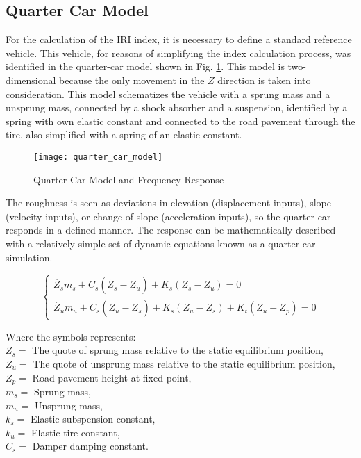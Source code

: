 \documentclass[tesi]{subfiles}
\begin{document}
\subsection{Quarter Car Model}\label{ssc:Quarter Car Model}
For the calculation of the IRI index, it is necessary to define a standard reference vehicle\cite{little_book}. This vehicle, for reasons of simplifying the index calculation process, was identified in the quarter-car model shown in Fig. \ref{fig:Quarter Car Model}. This model is two-dimensional because the only
movement in the $Z$ direction is taken into consideration. This model schematizes the vehicle with a sprung mass and a unsprung mass, connected by a shock absorber and a suspension, identified by a spring with own elastic constant and connected to the road pavement through the tire, also simplified with a spring of an elastic constant\cite{little_book}.

\begin{figure}[H]
\centering
\texttt{[image: quarter\_car\_model]}
\caption{Quarter Car Model and Frequency Response}

\label{fig:Quarter Car Model}
\end{figure}



 \noindent The roughness is seen as deviations in elevation\cite{gillespie1992everything} (displacement inputs), slope (velocity inputs), or change of slope (acceleration inputs), so the quarter car responds in a defined manner. The response can be mathematically described with a relatively simple set
of dynamic equations known as a quarter-car simulation.


\begin{center}

\[
    \left\{
                \begin{array}{ll}
                  \ddot{Z_{s}} m_{s} + C_{s} ( \dot{Z_{s}} - \dot{Z_{u}} ) + K_{s} (Z_{s} - Z_{u}) = 0\\
                   \ddot{Z_{u}} m_{u} + C_{s} ( \dot{Z_{u}} - \dot{Z_{s}}) + K_{s} (Z_{u} - Z_{s}) + K_{t} ( Z_{u} - Z_{p} ) = 0
                \end{array}
              \right.
\]




\end{center}

\noindent Where the symbols represents:
\\
$ Z_{s} =  $ The quote of sprung mass relative to the static equilibrium position,	\\
$ Z_{u} =  $ The quote of unsprung mass relative to the static equilibrium position,\\
$ Z_{p} = $ Road pavement height at fixed point,\\
$ m_{s} = $ Sprung mass,	\\
$ m_{u} = $ Unsprung mass, \\
$ k_{s} = $ Elastic subspension constant, \\
$ k_{u} = $ Elastic tire constant, \\
$C_{s} = $ Damper damping constant.\\
\end{document}
